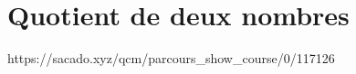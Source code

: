 

% 
% 


% 




\chapter{Quotient de deux nombres}
{https://sacado.xyz/qcm/parcours_show_course/0/117126}

